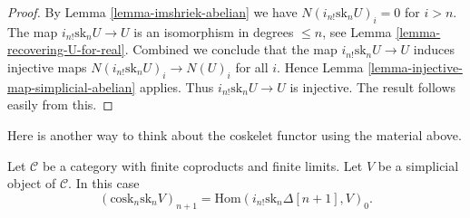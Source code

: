 \begin{proof}
By Lemma \ref{lemma-imshriek-abelian}
we have $N(i_{n!} \text{sk}_n U)_i = 0$
for $i > n$. The map
$i_{n!} \text{sk}_n U \to U$ is an isomorphism
in degrees $\leq n$, see Lemma \ref{lemma-recovering-U-for-real}.
Combined we conclude that the map $i_{n!} \text{sk}_n U \to U$
induces injective maps $N(i_{n!} \text{sk}_n U)_i \to N(U)_i$
for all $i$. Hence Lemma \ref{lemma-injective-map-simplicial-abelian}
applies. Thus $i_{n!} \text{sk}_n U \to U$
is injective. The result follows easily from this.
\end{proof}

\noindent
Here is another way to think about the coskelet functor
using the material above.

\begin{lemma}
\label{lemma-cosk-shriek}
Let $\mathcal{C}$ be a category with finite coproducts
and finite limits. Let $V$ be a simplicial object of $\mathcal{C}$.
In this case
$$
(\text{cosk}_n \text{sk}_n V)_{n + 1}
=
\text{Hom}(i_{n !}\text{sk}_n \Delta[n + 1], V)_0.
$$
\end{lemma}

